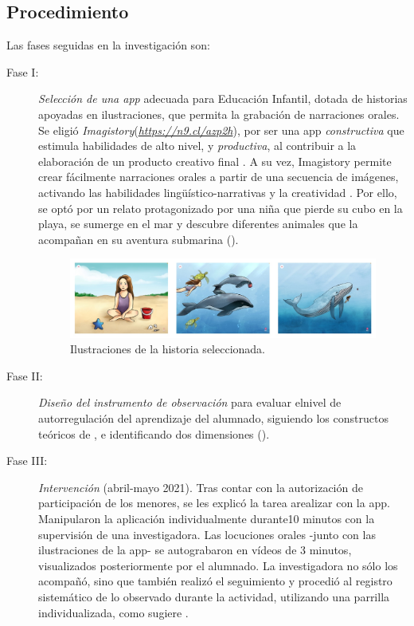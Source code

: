 \documentclass[spanish]{textolivre}
\begin{document}
\subsection{Procedimiento}\label{sec-procedimiento}
Las fases seguidas en la investigación son:

\begin{description}
\item[Fase I:] \textit{Selección de una app} adecuada para Educación Infantil,
dotada de historias apoyadas en ilustraciones, que permita la grabación
de narraciones orales. Se eligió \emph{Imagistory}(\href{https://n9.cl/azp2h}{\emph{https://n9.cl/azp2h}}), por ser una
app \emph{constructiva} que estimula habilidades de alto nivel, y
\emph{productiva}, al contribuir a la elaboración de un producto creativo final \cite{kay_creating_2018}. A su vez, Imagistory permite crear fácilmente narraciones orales a partir de una secuencia de imágenes,
activando las habilidades lingüístico-narrativas y la creatividad \cite{del-moral_evaluacion_2019,garcia-rodriguez_contenidos_2016}.
Por ello, se optó por un relato protagonizado por una niña que pierde su
cubo en la playa, se sumerge en el mar y descubre diferentes animales
que la acompañan en su aventura submarina ().

\begin{figure}[htbp] \centering \includegraphics[width=\textwidth]{fig01.jpg}
 \caption{Ilustraciones de la historia seleccionada.}
 \label{fig01}
\end{figure}

\item[Fase II:] \textit{Diseño del instrumento de observación} para evaluar elnivel de autorregulación del aprendizaje del alumnado, siguiendo los constructos teóricos de \textcite{berridi_ramirez_estrategias_2017,requena_arellano_autorregulacion_2020}, e identificando dos dimensiones ().

\item[Fase III:]  \textit{Intervención} (abril-mayo 2021). Tras contar con la
autorización de participación de los menores, se les explicó la tarea arealizar con la app. Manipularon la aplicación individualmente durante10 minutos con la supervisión de una investigadora. Las locuciones
orales -junto con las ilustraciones de la app- se autograbaron en vídeos
de 3 minutos, visualizados posteriormente por el alumnado. La
investigadora no sólo los acompañó, sino que también realizó el
seguimiento y procedió al registro sistemático de lo observado durante
la actividad, utilizando una parrilla individualizada, como sugiere \textcite{anguera_metodologiobservacion_1978}.


\end{description}
\end{document}
